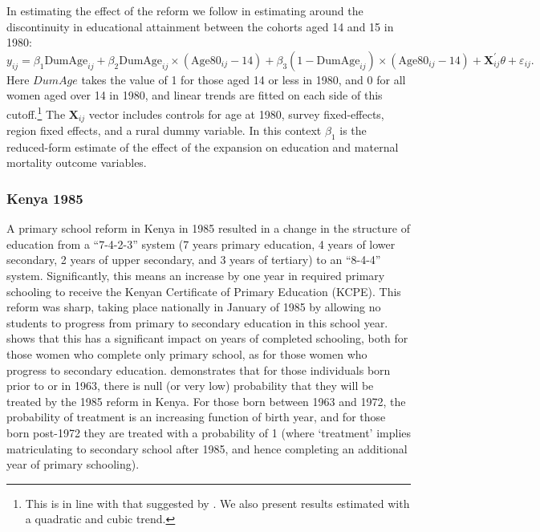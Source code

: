 \documentclass{article}[12pt,subeqn]
\begin{document}
\begin{spacing}{1.4}
In estimating the effect of the reform we follow \citet{AgueroBharawadj2011} in 
estimating around the discontinuity in educational attainment between the cohorts 
aged 14 and 15 in 1980: 
\begin{equation}
\label{eqn:Zimbabwe}
    y_{ij}=\beta_1\text{DumAge}_{ij}+
    \beta_2\text{DumAge}_{ij}\times(\text{Age}80_{ij}-14)+
    \beta_3(1-\text{DumAge}_{ij})\times(\text{Age}80_{ij}-14)+ 
    \textbf{X}^\prime_{ij}\theta+\varepsilon_{ij}.
\end{equation}
Here $DumAge$ takes the value of 1 for those aged 14 or less in 1980, and 0 for 
all women aged over 14 in 1980, and linear trends are fitted on each side of this 
cutoff.\footnote{This is in line with that suggested by 
\citet{AgueroBharawadj2011}.  We also present results estimated with a quadratic 
and cubic trend.} The $\textbf{X}_{ij}$ vector includes controls for age at 1980, 
survey fixed-effects, region fixed effects, and a rural dummy variable.  In this 
context $\beta_1$ is the reduced-form estimate of the effect of the expansion on 
education and maternal mortality outcome variables.

\subsubsection{Kenya 1985}
\label{ssscn:empiricsKenya}
A primary school reform in Kenya in 1985 resulted in a change in the structure of 
education from a ``7-4-2-3'' system (7 years primary education, 4 years of lower 
secondary, 2 years of upper secondary, and 3 years of tertiary) to an ``8-4-4'' 
system. Significantly, this means an increase by one year in required primary 
schooling to receive the Kenyan Certificate of Primary Education (KCPE). This 
reform was sharp, taking place nationally in January of 1985 by allowing no 
students to progress from primary to secondary education in this school 
year.\citet{Chicoine2011} shows that this has a significant impact on years of 
completed schooling, both for those women who complete only primary school, as for 
those women who progress to secondary education.\citet{Chicoine2011} demonstrates 
that for those individuals born prior to or in 1963, there is null (or very low)
probability that they will be treated by the 1985 reform in Kenya. For those born 
between 1963 and 1972, the probability of treatment is an increasing function of 
birth year, and for those born post-1972 they are treated with a probability of 1 
(where `treatment' implies matriculating to secondary school after 1985, and hence 
completing an additional year of primary schooling).


\end{spacing}
\end{document}

